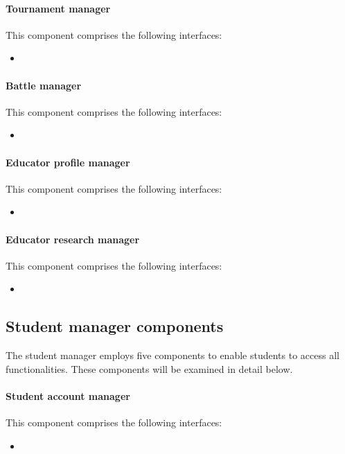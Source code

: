 \documentclass[12pt, a4paper]{report}
\begin{document}
    \paragraph*{Tournament manager}
    This component comprises the following interfaces: 
    \begin{itemize}
        \item 
    \end{itemize}

    \paragraph*{Battle manager}
    This component comprises the following interfaces: 
    \begin{itemize}
        \item 
    \end{itemize}

    \paragraph*{Educator profile manager}
    This component comprises the following interfaces: 
    \begin{itemize}
        \item 
    \end{itemize}

    \paragraph*{Educator research manager}
    This component comprises the following interfaces: 
    \begin{itemize}
        \item 
    \end{itemize}

    \subsection{Student manager components}
    The student manager employs five components to enable students to access all functionalities. 
    These components will be examined in detail below.

    \paragraph*{Student account manager}
    This component comprises the following interfaces: 
    \begin{itemize}
        \item 
    \end{itemize}
\end{document}
